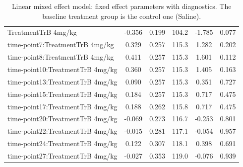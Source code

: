 \begin{table}
\begin{tabular}{lccccc}
		TreatmentTrB 4mg/kg             & -0.356      & 0.199     & 104.2 & -1.785  & 0.077   \\
		time-point7:TreatmentTrB 4mg/kg  & 0.329       & 0.257     & 115.3 & 1.282   & 0.202   \\
		time-point8:TreatmentTrB 4mg/kg  & 0.411       & 0.257     & 115.3 & 1.601   & 0.112   \\
		time-point10:TreatmentTrB 4mg/kg & 0.360       & 0.257     & 115.3 & 1.405   & 0.163   \\
		time-point13:TreatmentTrB 4mg/kg & 0.090       & 0.257     & 115.3 & 0.351   & 0.727   \\
		time-point15:TreatmentTrB 4mg/kg & 0.184       & 0.257     & 115.3 & 0.717   & 0.475   \\
		time-point17:TreatmentTrB 4mg/kg & 0.188       & 0.262     & 115.8 & 0.717   & 0.475   \\
		time-point20:TreatmentTrB 4mg/kg & -0.069      & 0.273     & 116.7 & -0.253  & 0.801   \\
		time-point22:TreatmentTrB 4mg/kg & -0.015      & 0.281     & 117.1 & -0.054  & 0.957   \\
		time-point24:TreatmentTrB 4mg/kg & 0.122       & 0.307     & 118.1 & 0.398   & 0.691   \\
		time-point27:TreatmentTrB 4mg/kg & -0.027      & 0.353     & 119.0 & -0.076  & 0.939   \\
		\hline
	\end{tabular}
	\caption{Linear mixed effect model: fixed effect parameters with diagnostics.
	The baseline treatment group is the control one (Saline).}
	\label{LME_factor_TrB_baseline_Saline}
\end{table}

